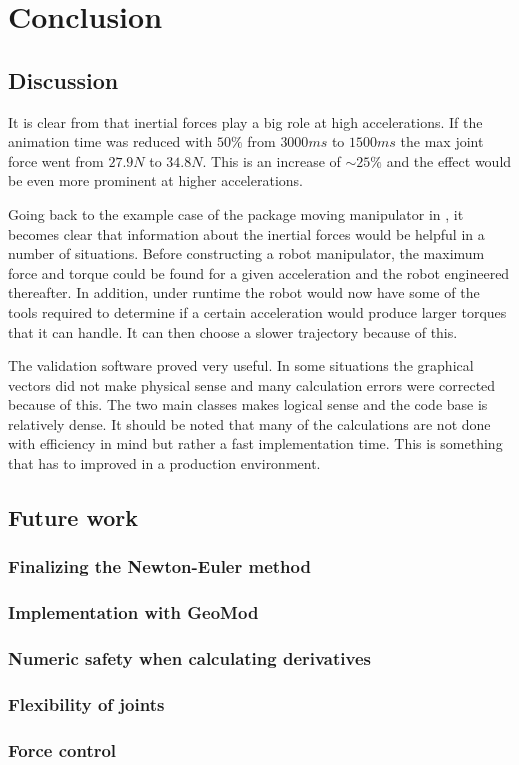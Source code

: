 \chapter{Conclusion}

\section{Discussion}

It is clear from  that inertial forces play a big role at high accelerations. If the animation time was reduced with $50\%$ from $3000ms$ to $1500ms$ the max joint force went from $27.9N$ to $34.8N$. This is an increase of $\sim 25\%$ and the effect would be even more prominent at higher accelerations.

Going back to the example case of the package moving manipulator in , it becomes clear that information about the inertial forces would be helpful in a number of situations. Before constructing a robot manipulator, the maximum force and torque could be found for a given acceleration and the robot engineered thereafter. In addition, under runtime the robot would now have some of the tools required to determine if a certain acceleration would produce larger torques that it can handle. It can then choose a slower trajectory because of this.

The validation software proved very useful. In some situations the graphical vectors did not make physical sense and many calculation errors were corrected because of this. The two main classes makes logical sense and the code base is relatively dense. It should be noted that many of the calculations are not done with efficiency in mind but rather a fast implementation time. This is something that has to improved in a production environment.

\section{Future work}
\subsection{Finalizing the Newton-Euler method}
\subsection{Implementation with GeoMod}
\subsection{Numeric safety when calculating derivatives}
\subsection{Flexibility of joints}
\subsection{Force control}
